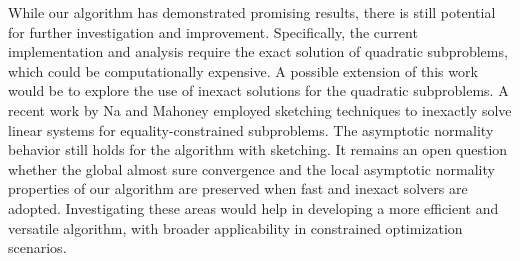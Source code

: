 \documentclass[aos]{imsart}
\numberwithin{equation}{section}
\theoremstyle{plain}
\begin{document}
While our algorithm has demonstrated promising results, there is still potential for further investigation and improvement. Specifically, the current implementation and analysis require the exact solution of quadratic subproblems, which could be computationally expensive. A possible extension of this work would be to explore the use of inexact solutions for the quadratic subproblems. A recent work by Na and Mahoney \cite{na2022asymptotic} employed sketching techniques to inexactly solve linear systems for equality-constrained subproblems. The asymptotic normality behavior still holds for the algorithm with sketching. It remains an open question whether the global almost sure convergence and the local asymptotic normality properties of our algorithm are preserved when fast and inexact solvers are adopted. 
Investigating these areas would help in developing a more efficient and versatile algorithm, with broader applicability in constrained optimization scenarios.




 




\end{document}
